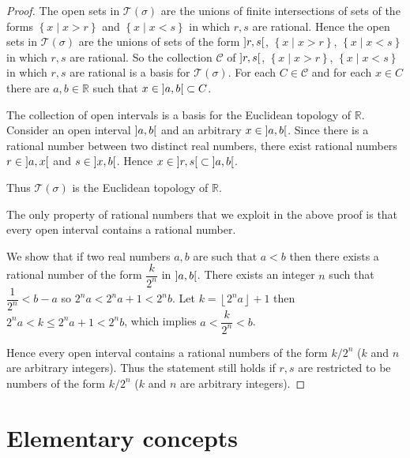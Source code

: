 \begin{proof}
	The open sets in \( \mathscr{T}(\sigma) \) are the unions of finite intersections of sets of the forms \( \left\{ x \mid x > r \right\} \) and \( \left\{ x \mid x < s \right\} \) in which \( r, s \) are rational. Hence the open sets in \( \mathscr{T}(\sigma) \) are the unions of sets of the form \( \left\rbrack{r, s}\right\lbrack \), \( \left\{ x \mid x > r \right\} \), \( \left\{ x \mid x < s \right\} \) in which \( r, s \) are rational. So the collection \( \mathscr{C} \) of \( \left\rbrack{r, s}\right\lbrack \), \( \left\{ x \mid x > r \right\} \), \( \left\{ x \mid x < s \right\} \) in which \( r, s \) are rational is a basis for \( \mathscr{T}(\sigma) \). For each \( C \in \mathscr{C} \) and for each \( x \in C \) there are \( a, b \in \mathbb{R} \) such that \( x \in \left\rbrack{a, b}\right\lbrack \subset C \).

	The collection of open intervals is a basis for the Euclidean topology of \( \mathbb{R} \). Consider an open interval \( \left\rbrack{a, b}\right\lbrack \) and an arbitrary \( x \in \left\rbrack{a, b}\right\lbrack \). Since there is a rational number between two distinct real numbers, there exist rational numbers \( r \in \left\rbrack{a, x}\right\lbrack \) and \( s \in \left\rbrack{x, b}\right\lbrack \). Hence \( x \in \left\rbrack{r, s}\right\lbrack \subset \left\rbrack{a, b}\right\lbrack \).

	Thus \( \mathscr{T}(\sigma) \) is the Euclidean topology of \( \mathbb{R} \).

	The only property of rational numbers that we exploit in the above proof is that every open interval contains a rational number.

	We show that if two real numbers \( a, b \) are such that \( a < b \) then there exists a rational number of the form \( \dfrac{k}{2^{n}} \) in \( \left\rbrack{a, b}\right\lbrack \). There exists an integer \( n \) such that \( \dfrac{1}{2^{n}} < b - a \) so \( 2^{n}a < 2^{n}a + 1 < 2^{n}b \). Let \( k = \left\lfloor 2^{n}a \right\rfloor + 1 \) then \( 2^{n}a < k \le 2^{n}a + 1 < 2^{n}b \), which implies \( a < \dfrac{k}{2^{n}} < b \).

	Hence every open interval contains a rational numbers of the form \( k/2^{n} \) (\(k\) and \(n\) are arbitrary integers). Thus the statement still holds if \( r, s \) are restricted to be numbers of the form \( k/2^{n} \) (\(k\) and \(n\) are arbitrary integers).
\end{proof}

\section{Elementary concepts}

